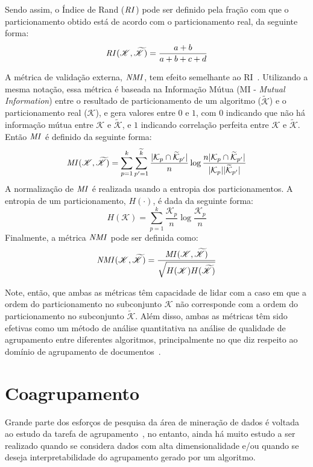 \documentclass[
    12pt,                %
    oneside,            %
    a4paper,            %
    english,            %
    brazil                %
    ]{abntex2ppgsi}
\begin{document}
Sendo assim, o Índice de Rand ($\text{\textit{RI}}$) pode ser definido pela fração com que o particionamento obtido está de acordo com o particionamento real, da seguinte forma:
\[
    \text{\textit{RI}}(\mathscr{K}, \mathscr{\widetilde{K}}) = \frac{a + b}{a + b + c + d}
\]

A métrica de validação externa, $\text{\textit{NMI}}$, tem efeito semelhante ao RI~\cite{Manning2008}.
Utilizando a mesma notação, essa métrica é baseada na Informação Mútua (MI - \textit{Mutual Information}) entre o resultado de particionamento de um algoritmo ($\mathscr{\widetilde{K}}$) e o particionamento real ($\mathscr{K}$), e gera valores entre $0$ e $1$, com $0$ indicando que não há informação mútua entre $\mathscr{K}$ e $\mathscr{\widetilde{K}}$, e $1$ indicando correlação perfeita entre $\mathscr{K}$ e $\mathscr{\widetilde{K}}$.
Então $\text{\textit{MI}}$ é definido da seguinte forma:
\[
    \text{\textit{MI}}(\mathscr{K}, \mathscr{\widetilde{K}}) = \displaystyle \sum_{p=1}^k \sum_{p'=1}^{\widetilde{k}} \frac{|\mathcal{K}_p \cap \mathcal{\widetilde{K}}_{p'}|}{n} \log \frac{n |\mathcal{K}_p \cap \mathcal{\widetilde{K}}_{p'}|}{|\mathcal{K}_p| |\mathcal{\widetilde{K}}_{p'}|}
\]
A normalização de $\text{\textit{MI}}$ é realizada usando a entropia dos particionamentos.
A entropia de um particionamento, $H(\cdot)$, é dada da seguinte forma:
\[
    H(\mathscr{K}) = \displaystyle \sum_{p=1}^k \frac{\mathcal{K}_p}{n} \log \frac{\mathcal{K}_p}{n}
\]
Finalmente, a métrica $\text{\textit{NMI}}$ pode ser definida como:
\[
    \text{\textit{NMI}}(\mathscr{K}, \mathscr{\widetilde{K}}) = \frac{\text{\textit{MI}}(\mathscr{K}, \mathscr{\widetilde{K}})}{\sqrt{H(\mathscr{K}) H(\mathscr{\widetilde{K}})}}
\]

Note, então, que ambas as métricas têm capacidade de lidar com a caso em que a ordem do particionamento no subconjunto $\mathscr{K}$ não corresponde com a ordem do particionamento no subconjunto $\mathscr{\widetilde{K}}$.
Além disso, ambas as métricas têm sido efetivas como um método de análise quantitativa na análise de qualidade de agrupamento entre diferentes algoritmos, principalmente no que diz respeito ao domínio de agrupamento de documentos~\cite{Kuang2014,Ho2008,Wang2011,Ding06,Xu2003,Yoo2010}.

\section{Coagrupamento}
\label{sec:coclustering}

Grande parte dos esforços de pesquisa da área de mineração de dados é voltada ao estudo da tarefa de agrupamento~\cite{Han2011}, no entanto, ainda há muito estudo a ser realizado quando se considera dados com alta dimensionalidade e/ou quando se deseja interpretabilidade do agrupamento gerado por um algoritmo.
\end{document}
